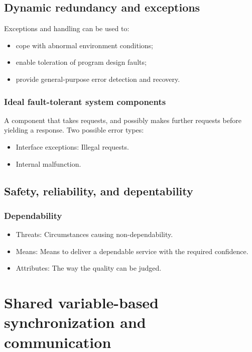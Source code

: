 \documentclass[a4paper, 12pt]{article}
\begin{document}
\subsection{Dynamic redundancy and exceptions}
Exceptions and handling can be used to:
\begin{itemize}
	\item cope with abnormal environment conditions;
	\item enable toleration of program design faults;
	\item provide general-purpose error detection and recovery.
\end{itemize}

\subsubsection{Ideal fault-tolerant system components}
A component that takes requests, and possibly makes further requests before yielding a response. Two possible error types:
\begin{itemize}
	\item Interface exceptions: Illegal requests.
	\item Internal malfunction.
\end{itemize}

\subsection{Safety, reliability, and depentability}
\subsubsection{Dependability}
\begin{itemize}
	\item Threats: Circumstances causing non-dependability.
	\item Means: Means to deliver a dependable service with the required confidence.
	\item Attributes: The way the quality can be judged.
\end{itemize}



\section{Shared variable-based synchronization and communication}
\end{document}
